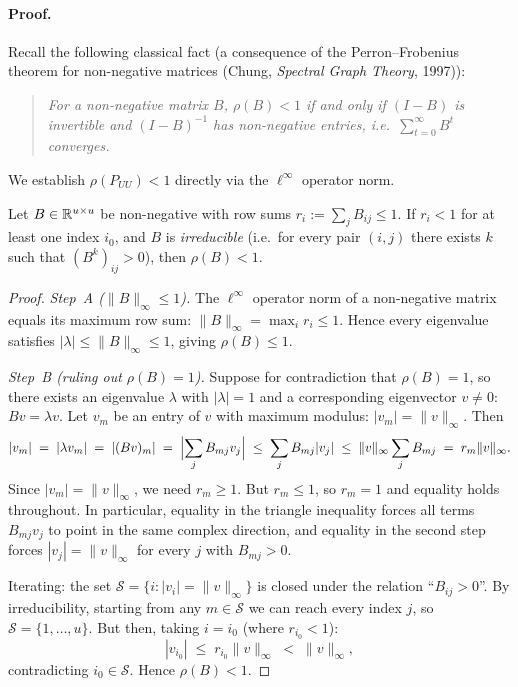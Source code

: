 \begin{notechapter}
\paragraph{Proof.}
Recall the following classical fact (a consequence of the Perron--Frobenius
theorem for non-negative matrices (Chung, \emph{Spectral Graph Theory}, 1997)):

\begin{quote}
\emph{For a non-negative matrix $B$, $\rho(B) < 1$ if and only if
$(I - B)$ is invertible and $(I-B)^{-1}$ has non-negative entries, i.e.\
$\sum_{t=0}^\infty B^t$ converges.}
\end{quote}

We establish $\rho(P_{UU}) < 1$ directly via the $\ell^\infty$ operator norm.

\begin{lemma}
Let $B \in \mathbb{R}^{u \times u}$ be non-negative with row sums
$r_i := \sum_j B_{ij} \leq 1$.  If $r_i < 1$ for at least one index $i_0$,
and $B$ is \emph{irreducible} (i.e.\ for every pair $(i,j)$ there exists $k$
such that $(B^k)_{ij} > 0$), then $\rho(B) < 1$.
\end{lemma}

\begin{proof}
\emph{Step~A ($\|B\|_\infty \leq 1$).}
The $\ell^\infty$ operator norm of a non-negative matrix equals its maximum row
sum: $\|B\|_\infty = \max_i r_i \leq 1$.  Hence every eigenvalue satisfies
$|\lambda| \leq \|B\|_\infty \leq 1$, giving $\rho(B) \leq 1$.

\emph{Step~B (ruling out $\rho(B) = 1$).}
Suppose for contradiction that $\rho(B)=1$, so there exists an eigenvalue
$\lambda$ with $|\lambda|=1$ and a corresponding eigenvector $v \neq 0$:
$Bv = \lambda v$.  Let $v_m$ be an entry of $v$ with maximum modulus:
$|v_m| = \|v\|_\infty$.  Then
\[
  |v_m| \;=\; |\lambda v_m| \;=\; |(Bv)_m|
  \;=\; \Bigl|\sum_j B_{mj} v_j\Bigr|
  \;\leq\; \sum_j B_{mj}|v_j|
  \;\leq\; \|v\|_\infty \sum_j B_{mj}
  \;=\; r_m \|v\|_\infty.
\]
Since $|v_m| = \|v\|_\infty$, we need $r_m \geq 1$.  But $r_m \leq 1$, so
$r_m = 1$ and equality holds throughout.  In particular, equality in the
triangle inequality forces all terms $B_{mj}v_j$ to point in the same complex
direction, and equality in the second step forces $|v_j| = \|v\|_\infty$
for every $j$ with $B_{mj} > 0$.

Iterating: the set $\mathcal{S} = \{i : |v_i| = \|v\|_\infty\}$ is closed
under the relation ``$B_{ij} > 0$''.  By irreducibility, starting from any
$m \in \mathcal{S}$ we can reach every index $j$, so $\mathcal{S} = \{1,
\ldots, u\}$.  But then, taking $i = i_0$ (where $r_{i_0} < 1$):
\[
  |v_{i_0}| \;\leq\; r_{i_0}\|v\|_\infty \;<\; \|v\|_\infty,
\]
contradicting $i_0 \in \mathcal{S}$.  Hence $\rho(B) < 1$.
\end{proof}


\end{notechapter}
